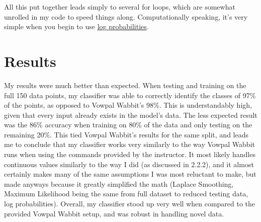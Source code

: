 \documentclass{article}
\begin{document}
All this put together leads simply to several for loops, which are somewhat unrolled in my code to speed things along. Computationally speaking, it's very simple when you begin to use \href{https://en.wikipedia.org/wiki/Log_probability}{log probabilities}. 

\section{Results}
My results were much better than expected. When testing and training on the full 150 data points, my classifier was able to correctly identify the classes of 97\% of the points, as opposed to Vowpal Wabbit's 98\%. This is understandably high, given that every input already exists in the model's data. The less expected result was the 86\% accuracy when training on 80\% of the data and only testing on the remaining 20\%. This tied Vowpal Wabbit's results for the same split, and leads me to conclude that my classifier works very similarly to the way Vowpal Wabbit runs when using the commands provided by the instructor. It most likely handles continuous values similarly to the way I did (as discussed in 2.2.2), and it almost certainly makes many of the same assumptions I was most reluctant to make, but made anyways because it greatly simplified the math (Laplace Smoothing, Maximum Likelihood being the same from full dataset to reduced testing data, log probabilities). Overall, my classifier stood up very well when compared to the provided Vowpal Wabbit setup, and was robust in handling novel data.
\end{document}
